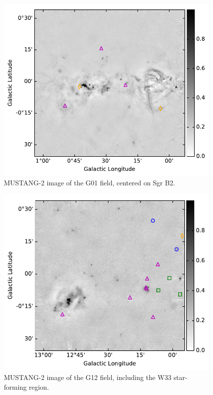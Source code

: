 \documentclass[twocolumn]{aastex62}
\newcommand{\MUSTANG}{MUSTANG-2\xspace}
\begin{document}
\begin{figure}[htp]
\includegraphics[width=17cm]{figures/G01_overview_withcatalog.pdf}
\caption{\MUSTANG image of the G01 field, centered on Sgr B2.
}
\label{fig:g01overview}
\end{figure}

\begin{figure}[htp]
\includegraphics[width=17cm]{figures/G12_overview_withcatalog.pdf}
\caption{\MUSTANG image of the G12 field, including the W33 star-forming region.}
\label{fig:g12overview}
\end{figure}
\end{document}
